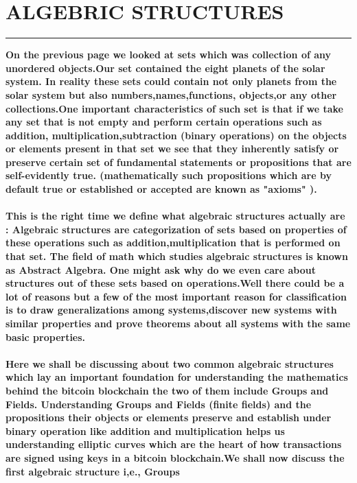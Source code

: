 \documentclass{article}
\begin{document}
\section * {ALGEBRIC STRUCTURES}
\hrule
\bigskip
\textbf{On the previous page we looked at sets which was collection of any unordered objects.Our set contained the eight planets of the solar system. In reality these sets could contain not only planets from the solar system but also  numbers,names,functions, objects,or any other  collections.One important characteristics of such set is that if we take any set that is not empty  and perform certain operations such as addition, multiplication,subtraction (binary operations) on the objects or elements present in that set we see that  they inherently satisfy or preserve certain set of fundamental statements or propositions that are self-evidently true. (mathematically such propositions which are by default true or established or accepted are known as  "axioms" ).
\\
\\
This is the right time we define what algebraic structures actually are : Algebraic structures are categorization of sets  based on properties of these operations such as addition,multiplication that is performed on that set. The field of math which studies algebraic structures is known as Abstract Algebra.  One might ask why do we even care about structures out of these sets based on operations.Well there could be a lot of reasons but a few of the most important reason for classification  is to draw generalizations among systems,discover new systems with similar properties and prove theorems about all systems with the same basic properties.}
\\
\\
\textbf{ Here we shall be discussing about two common algebraic  structures which lay an important foundation for understanding the mathematics behind the bitcoin blockchain the two of them include Groups and Fields. Understanding Groups and Fields (finite fields) and the propositions their objects or elements preserve and  establish  under binary operation like addition and multiplication helps us understanding elliptic curves which are the heart of how transactions are signed using keys in a bitcoin blockchain.We shall now discuss the first algebraic structure i,e., Groups}
\pagebreak
\end{document}
